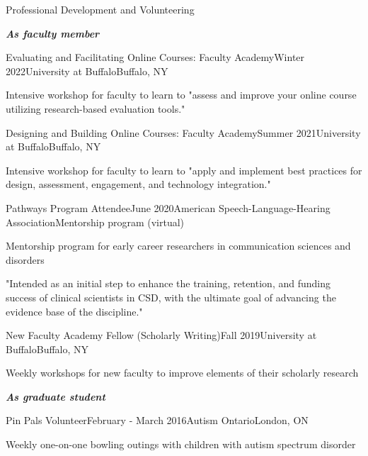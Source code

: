 \documentclass{resume} %
\begin{document}
\begin{rSection}{Professional Development and Volunteering}

\bigskip
\begin{center}
	{\bf \emph{As faculty member}}\\
\end{center}

	\begin{rSubsection}{Evaluating and Facilitating Online Courses: Faculty Academy}{Winter 2022}{University at Buffalo}{Buffalo, NY}
		\item Intensive workshop for faculty to learn to "assess and improve your online course utilizing research-based evaluation tools."
	\end{rSubsection}

	\begin{rSubsection}{Designing and Building Online Courses: Faculty Academy}{Summer 2021}{University at Buffalo}{Buffalo, NY}
		\item Intensive workshop for faculty to learn to "apply and implement best practices for design, assessment, engagement, and technology integration."
	\end{rSubsection}


	\begin{rSubsection}{Pathways Program Attendee}{June 2020}{American Speech-Language-Hearing Association}{Mentorship program (virtual)}
		\item Mentorship program for early career researchers in communication sciences and disorders
		\item "Intended as an initial step to enhance the training, retention, and funding success of clinical scientists in CSD, with the ultimate goal of advancing the evidence base of the discipline."
	\end{rSubsection}

	\begin{rSubsection}{New Faculty Academy Fellow (Scholarly Writing)}{Fall 2019}{University at Buffalo}{Buffalo, NY}
		\item Weekly workshops for new faculty to improve elements of their scholarly research
	\end{rSubsection}

\bigskip
\begin{center}
	{\bf \emph{As graduate student}}\\
\end{center}

	\begin{rSubsection}{Pin Pals Volunteer}{February - March 2016}{Autism Ontario}{London, ON}
	\item Weekly one-on-one bowling outings with children with autism spectrum disorder
	

\end{rSubsection}
\end{rSection}
\end{document}
